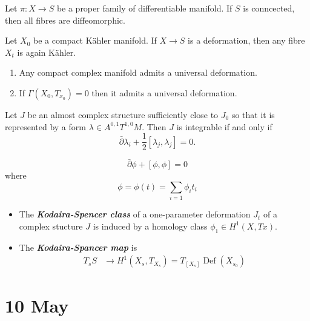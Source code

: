 \documentclass{article}
\numberwithin{equation}{section}
\DeclareMathOperator{\Def}{Def}
\renewcommand{\Def}{\operatorname{Def}}
\begin{document}
\begin{thm}[Ehresmann]
	Let $\pi:X\to S$ be a proper family of differentiable manifold. If $S$ is conncected, then all fibres are diffeomorphic.
\end{thm}
\begin{thm}[Kodaira]
	Let $X_0$ be a compact Kähler manifold. If $X\to S$ is a deformation, then any fibre $X_t$ is again Kähler.
\end{thm}
\begin{thm}[Kuranashi]\leavevmode
	\begin{enumerate}
		\item Any compact complex manifold admits a universal deformation.
		\item If $\Gamma(X_0,T_{x_0})=0$ then it admits a universal deformation.
	\end{enumerate}
\end{thm}
\begin{lemma}
	Let $J$ be an almost complex structure sufficiently close to $J_0$ so that it is represented by a form $\lambda\in A^{0,1}T^{1,0}M$. Then $J$ is integrable if and only if 
	\[\bar{\partial}\lambda_i+\frac{1}{2}[\lambda_j,\lambda_j]=0.\]
\end{lemma}
\begin{thm}
	\[\bar{\partial}\phi+[\phi,\phi]=0\]
	where
	\[\phi=\phi(t)=\sum_{i=1}\phi_it_i\]
\end{thm}
\begin{defn}\leavevmode
	\begin{itemize}
		\item The \textbf{\textit{Kodaira-Spencer class}} of a one-parameter deformation $J_t$ of a complex stucture $J$ is induced by a homology class $\phi_1\in H^1(X,Tx)$.
		\item The \textbf{\textit{Kodaira-Spancer map}} is
		\begin{align*}
			T_sS&\to H^1(X_s,T_{X_s})=T_{[X_s]}\Def(X_{s_0})
		\end{align*}
	\end{itemize}
\end{defn}

\section{10 May}
\end{document}
